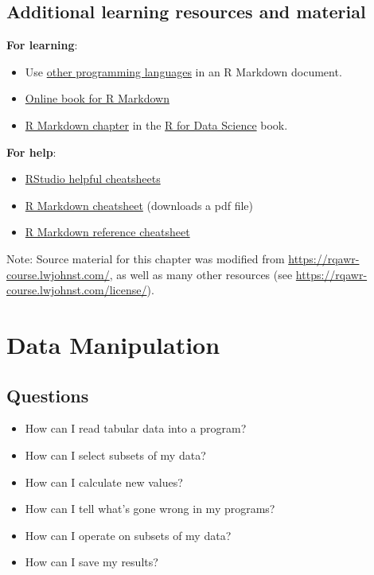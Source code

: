 \documentclass[]{Nemilov}
\providecommand{\tightlist}{%
  \setlength{\itemsep}{0pt}\setlength{\parskip}{0pt}}
\begin{document}
\hypertarget{r-reproducibility-resources}{%
\section{Additional learning resources and material}\label{r-reproducibility-resources}}

\textbf{For learning}:

\begin{itemize}
\tightlist
\item
  Use \href{https://bookdown.org/yihui/rmarkdown/language-engines.html}{other programming languages}
  in an R Markdown document.
\item
  \href{https://bookdown.org/yihui/rmarkdown/}{Online book for R Markdown}
\item
  \href{https://r4ds.had.co.nz/r-markdown.html\#r-markdown}{R Markdown chapter} in the
  \href{http://r4ds.had.co.nz/}{R for Data Science} book.
\end{itemize}

\textbf{For help}:

\begin{itemize}
\tightlist
\item
  \href{https://www.rstudio.com/resources/cheatsheets/}{RStudio helpful cheatsheets}
\item
  \href{https://github.com/rstudio/cheatsheets/raw/master/rmarkdown-2.0.pdf}{R Markdown cheatsheet} (downloads a pdf file)
\item
  \href{https://www.rstudio.com/wp-content/uploads/2015/03/rmarkdown-reference.pdf}{R Markdown reference cheatsheet}
\end{itemize}

Note: Source material for this chapter was modified from
\url{https://rqawr-course.lwjohnst.com/}, as well as many other resources (see
\url{https://rqawr-course.lwjohnst.com/license/}).

\hypertarget{r-data-manipulation}{%
\chapter{Data Manipulation}\label{r-data-manipulation}}

\hypertarget{r-data-manipulation-questions}{%
\section{Questions}\label{r-data-manipulation-questions}}

\begin{itemize}
\tightlist
\item
  How can I read tabular data into a program?
\item
  How can I select subsets of my data?
\item
  How can I calculate new values?
\item
  How can I tell what's gone wrong in my programs?
\item
  How can I operate on subsets of my data?
\item
  How can I save my results?
\end{itemize}
\end{document}
